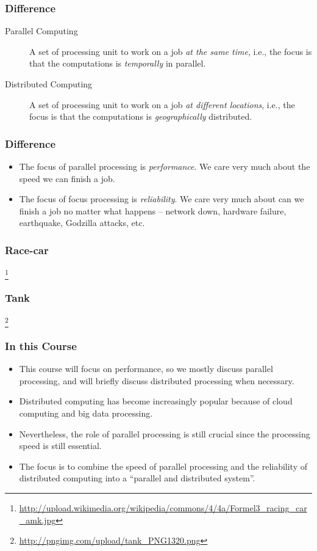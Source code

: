 \documentclass{beamer}
\begin{document}
\begin{CJK}{UTF8}{bsmi}
\begin{frame}
\frametitle{Difference}
\begin{description}
\item[Parallel Computing] A set of processing unit to work on a job
  {\em at the same time}, i.e., the focus is that the computations is
  {\em temporally} in parallel.
\item[Distributed Computing] A set of processing unit to work on a job
  {\em at different locations}, i.e., the focus is that the
  computations is {\em geographically} distributed.
\end{description}
\end{frame}

\begin{frame}
\frametitle{Difference}
\begin{itemize}
\item The focus of parallel processing is {\em performance}.  We care
  very much about the speed we can finish a job.
\item The focus of focus processing is {\em reliability}.  We care
  very much about can we finish a job no matter what happens --
  network down, hardware failure, earthquake, Godzilla attacks, etc.
\end{itemize}
\end{frame}

\begin{frame}
\frametitle{Race-car}
\centerline{}
\footnote{\url{http://upload.wikimedia.org/wikipedia/commons/4/4a/Formel3_racing_car_amk.jpg}}
\end{frame}

\begin{frame}
\frametitle{Tank}
\centerline{}
\footnote{\url{http://pngimg.com/upload/tank_PNG1320.png}}
\end{frame}

\begin{frame}
\frametitle{In this Course}
\begin{itemize}
\item This course will focus on performance, so we mostly discuss
  parallel processing, and will briefly discuss distributed processing
  when necessary.
\item Distributed computing has become increasingly popular because of
  cloud computing and big data processing.
\item Nevertheless, the role of parallel processing is still crucial
  since the processing speed is still essential.
\item The focus is to combine the speed of parallel processing and the
  reliability of distributed computing into a ``parallel and
  distributed system''.
\end{itemize}
\end{frame}


\end{CJK}
\end{document}
